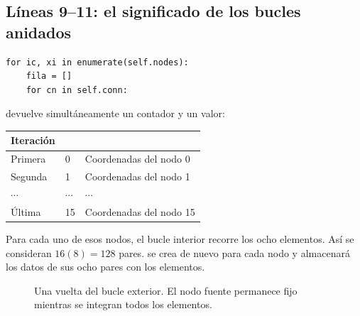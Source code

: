 \documentclass[11pt,a4paper]{article}
\numberwithin{equation}{section}
\newcommand{\vect}[1]{\bm{#1}}
\DeclareRobustCommand{\code}[1]{\texttt{\detokenize{#1}}}
\begin{document}
\subsection{L\'ineas 9--11: el significado de los bucles anidados}
\begin{lstlisting}
for ic, xi in enumerate(self.nodes):
    fila = []
    for cn in self.conn:
\end{lstlisting}
\code{enumerate} devuelve simult\'aneamente un contador y un valor:
\begin{center}
\begin{tabular}{lll}
\toprule
Iteraci\'on & \code{ic} & \code{xi}\\
\midrule
Primera & 0 & Coordenadas del nodo 0\\
Segunda & 1 & Coordenadas del nodo 1\\
$\cdots$ & $\cdots$ & $\cdots$\\
\'Ultima & 15 & Coordenadas del nodo 15\\
\bottomrule
\end{tabular}
\end{center}
Para cada uno de esos nodos, el bucle interior recorre los ocho elementos.
As\'i se consideran $16(8)=128$ pares.
\code{fila} se crea de nuevo para cada nodo y almacenar\'a los datos
de sus ocho pares con los elementos.

\begin{figure}[htbp]
\centering
{}
\caption{Una vuelta del bucle exterior. El nodo fuente permanece fijo
mientras se integran todos los elementos.}
\end{figure}
\end{document}
